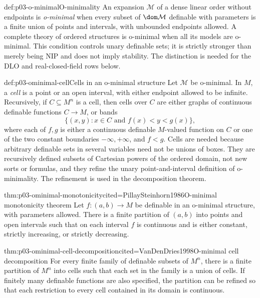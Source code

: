 \begin{hbdefinition}{def:p03-o-minimal}{O-minimality}
An expansion \(\mathcal M\) of a dense linear order without endpoints is
\emph{o-minimal} when every subset of \(\dom\mathcal M\) definable with
parameters is a finite union of points and intervals, with unbounded endpoints
allowed.  A complete theory of ordered structures is o-minimal when all its
models are o-minimal.  This condition controls unary definable sets; it is
strictly stronger than merely being NIP and does not imply stability.  The
distinction is needed for the DLO and real-closed-field rows below.
\end{hbdefinition}

\begin{hbdefinition}{def:p03-ominimal-cell}{Cells in an o-minimal structure}
Let \(\mathcal M\) be o-minimal.  In \(M\), a \emph{cell} is a point or an
open interval, with either endpoint allowed to be infinite.  Recursively, if
\(C\subseteq M^n\) is a cell, then cells over \(C\) are either graphs of
continuous definable functions \(C\to M\), or bands
\[
\{(x,y):x\in C\text{ and }f(x)<y<g(x)\},
\]
where each of \(f,g\) is either a continuous definable \(M\)-valued function
on \(C\) or one of the two constant boundaries \(-\infty,+\infty\), and
\(f<g\).  Cells are needed because arbitrary definable sets
in several variables need not be unions of boxes.  They are recursively
defined subsets of Cartesian powers of the ordered domain, not new sorts or
formulas, and they refine the unary point-and-interval definition of
o-minimality.  The refinement is used in the decomposition theorem.
\end{hbdefinition}

\begin{hbtheorem}{thm:p03-ominimal-monotonicity}{cited=PillaySteinhorn1986}{O-minimal monotonicity theorem}
Let \(f:(a,b)\to M\) be definable in an o-minimal structure, with parameters
allowed.  There is a finite partition of \((a,b)\) into points and open
intervals such that on each interval \(f\) is continuous and is either
constant, strictly increasing, or strictly decreasing.
\end{hbtheorem}

\begin{hbtheorem}{thm:p03-ominimal-cell-decomposition}{cited=VanDenDries1998}{O-minimal cell decomposition}
For every finite family of definable subsets of \(M^n\), there is a finite
partition of \(M^n\) into cells such that each set in the family is a union of
cells.  If finitely many definable functions are also specified, the partition
can be refined so that each restriction to every cell contained in its domain
is continuous.
\end{hbtheorem}


